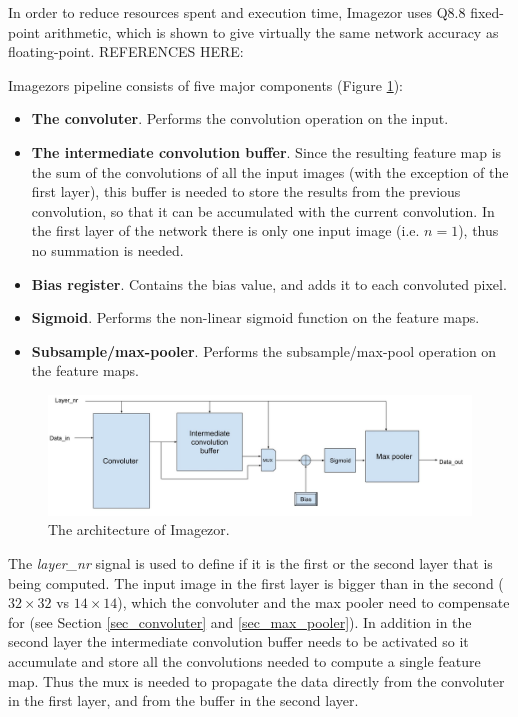 In order to reduce resources spent and execution time, Imagezor uses Q8.8 fixed-point arithmetic, which is shown to give virtually the same network accuracy as floating-point. REFERENCES HERE: 

Imagezors pipeline consists of five major components (Figure \ref{fig_imagezor_architecture}):

\begin{itemize}
	\item \textbf{The convoluter}. Performs the convolution operation on the input.
	\item \textbf{The intermediate convolution buffer}. Since the resulting feature map is the sum of the convolutions of all the input images (with the exception of the first layer), this buffer is needed to store the results from the previous convolution, so that it can be accumulated with the current convolution. In the first layer of the network there is only one input image (i.e. $ n = 1 $), thus no summation is needed.
	\item \textbf{Bias register}. Contains the bias value, and adds it to each convoluted pixel. 
	\item \textbf{Sigmoid}. Performs the non-linear sigmoid function  on the feature maps.
	\item \textbf{Subsample/max-pooler}. Performs the subsample/max-pool operation on the feature maps. 
\end{itemize}

\begin{figure}[h!]
	\centering
    	\includegraphics[width=1.0\textwidth]{Figures/Method/conv_layer_arch}
  	\caption{The architecture of Imagezor.}
  	\label{fig_imagezor_architecture}
\end{figure}

The \textit{layer\_nr} signal is used to define if it is the first or the second layer that is being computed. The input image in the first layer is bigger than in the second ($ 32 \times 32 $ vs $ 14 \times 14 $), which the convoluter and the max pooler need to compensate for (see Section \ref{sec_convoluter} and \ref{sec_max_pooler}). In addition in the second layer the intermediate convolution buffer needs to be activated so it accumulate and store all the convolutions needed to compute a single feature map. Thus the mux is needed to propagate the data directly from the convoluter in the first layer, and from the buffer in the second layer. 

